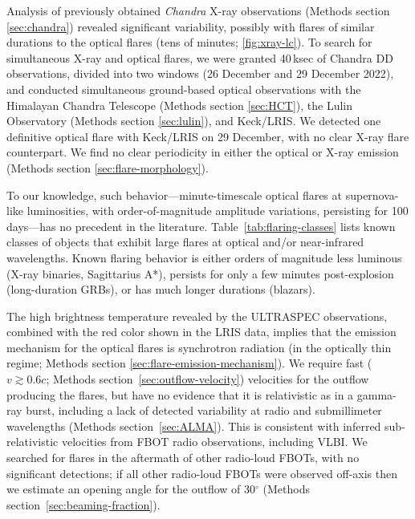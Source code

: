 \documentclass{nature_plusfigure}
\begin{document}
Analysis of previously obtained \emph{Chandra} X-ray observations (Methods section \ref{sec:chandra}) revealed significant variability, possibly with flares of similar durations to the optical flares (tens of minutes; \ref{fig:xray-lc}). To search for simultaneous X-ray and optical flares,
we were granted 40\,ksec of Chandra DD observations, divided into two windows (26 December and 29 December 2022),
and conducted simultaneous ground-based optical observations with the Himalayan Chandra Telescope (Methods section \ref{sec:HCT}), the Lulin Observatory (Methods section \ref{sec:lulin}), and Keck/LRIS. We detected one definitive optical flare with Keck/LRIS on 29 December, with no clear X-ray flare counterpart.
We find no clear periodicity in either the optical or X-ray emission (Methods section \ref{sec:flare-morphology}).

To our knowledge, such behavior---minute-timescale optical flares at supernova-like luminosities, with order-of-magnitude amplitude variations, persisting for 100 days---has no precedent in the literature. Table~\ref{tab:flaring-classes} lists known classes of objects that exhibit large flares at optical and/or near-infrared wavelengths. Known flaring behavior is either orders of magnitude less luminous (X-ray binaries\cite{Fender1997}, Sagittarius A*\cite{Marrone2008}), persists for only a few minutes post-explosion (long-duration GRBs\cite{Racusin2008}), or has much longer durations (blazars\cite{Nesci2021}).  

The high brightness temperature revealed by the ULTRASPEC observations, combined with the red color shown in the LRIS data, implies that the emission mechanism for the optical flares is synchrotron radiation (in the optically thin regime; Methods section \ref{sec:flare-emission-mechanism}). 
We require fast ($v\gtrsim0.6c$; Methods section~\ref{sec:outflow-velocity}) velocities for the outflow producing the flares, but have no evidence that it is relativistic as in a gamma-ray burst, including a lack of detected variability at radio and submillimeter wavelengths (Methods section~\ref{sec:ALMA}).
This is consistent with inferred sub-relativistic velocities from FBOT radio observations\cite{Ho2019,Margutti2019,Coppejans2020,Ho2020_Koala,Ho2022}, including VLBI\cite{Mohan2020}.
We searched for flares in the aftermath of other radio-loud FBOTs, with no significant detections; if all other radio-loud FBOTs were observed off-axis then we estimate an opening angle for the outflow of 30$^{\circ}$ (Methods section~\ref{sec:beaming-fraction}).
\end{document}
